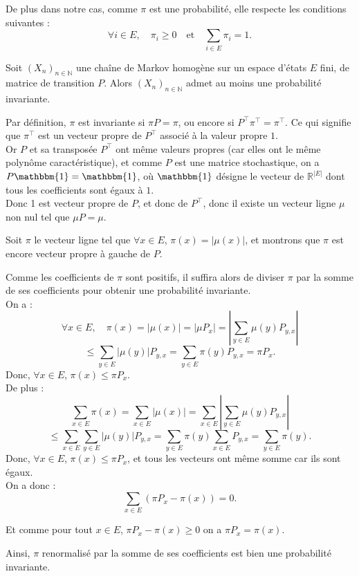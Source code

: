 \documentclass{article}
\begin{document}
De plus dans notre cas, comme $\pi$ est une probabilité, elle respecte les conditions suivantes :
\[
\forall i \in E, \quad \pi_i \geq 0 \quad \text{et} \quad \sum_{i \in E} \pi_i = 1.
\]

\begin{tcolorbox}[colback=white,colframe=blue!80!black,title=Existence d'une probabilité invariante]
Soit $(X_n)_{n \in \mathbb{N}}$ une chaîne de Markov homogène sur un espace d'états $E$ fini, de matrice de transition $P$. Alors $(X_n)_{n \in \mathbb{N}}$ admet au moins une probabilité invariante.
\end{tcolorbox}

\begin{tcolorbox}[colback=white,colframe=green!80!black,title=Démonstration, breakable]

Par définition, $\pi$ est invariante si $\pi P = \pi$, ou encore si $P^{\top} \pi^{\top} = \pi^{\top}$. Ce qui signifie que $\pi^{\top}$ est un vecteur propre de $P^{\top}$ associé à la valeur propre $1$. \\

Or $P$ et sa transposée $P^{\top}$ ont même valeurs propres (car elles ont le même polynôme caractéristique), et comme $P$ est une matrice stochastique, on a $P \mathbbm{1} = \mathbbm{1}$, où $\mathbbm{1}$ désigne le vecteur de $\mathbb{R}^{|E|}$ dont tous les coefficients sont égaux à $1$. \\

Donc 1 est vecteur propre de $P$, et donc de $P^{\top}$, donc il existe un vecteur ligne $\mu$ non nul tel que $\mu P = \mu$.

Soit $\pi$ le vecteur ligne tel que $\forall x \in E$, $\pi(x) = |\mu(x)|$, et montrons que $\pi$ est encore vecteur propre à gauche de $P$.

Comme les coefficients de $\pi$ sont positifs, il suffira alors de diviser $\pi$ par la somme de ses coefficients pour obtenir une probabilité invariante. \\

On a :
\[
\forall x \in E, \quad \pi(x) = |\mu(x)| = |\mu P_x| = \left| \sum_{y \in E} \mu(y) P_{y,x} \right|
\]
\[
\leq \sum_{y \in E} |\mu(y)| P_{y,x} = \sum_{y \in E} \pi(y) P_{y,x} = \pi P_x.
\]
Donc, $\forall x \in E$, $\pi(x) \leq \pi P_x$. \\

De plus :
\[
\sum_{x \in E} \pi(x) = \sum_{x \in E} |\mu(x)| = \sum_{x \in E} \left| \sum_{y \in E} \mu(y) P_{y,x} \right|
\]
\[
\leq \sum_{x \in E} \sum_{y \in E} |\mu(y)| P_{y,x} = \sum_{y \in E} \pi(y) \sum_{x \in E} P_{y,x} = \sum_{y \in E} \pi(y).
\]
Donc, $\forall x \in E$, $\pi(x) \leq \pi P_x$, et tous les vecteurs ont même somme car ils sont égaux. \\

On a donc :
\[
\sum_{x \in E} (\pi P_x - \pi(x)) = 0.
\]

Et comme pour tout $x \in E$, $\pi P_x - \pi(x) \geq 0$ on a $\pi P_x = \pi(x)$.

Ainsi, $\pi$ renormalisé par la somme de ses coefficients est bien une probabilité invariante.
\end{tcolorbox}
  
\end{document}
